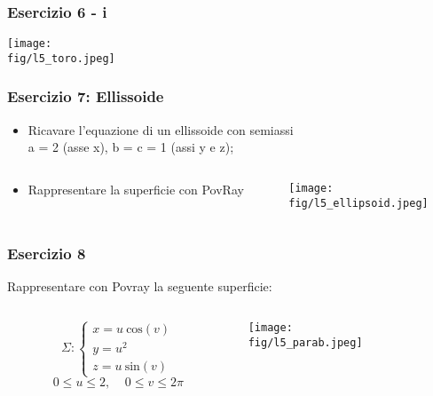 \documentclass{beamer}
\newcommand{\fig}{./figures} %
\newcommand{\msin}{\mbox{sin}} %
\newcommand{\mcos}{\mbox{cos}} %
\begin{document}
\begin{frame}
\frametitle{Esercizio 6 - i}
\texttt{[image: \\fig/l5\_toro.jpeg]}
\end{frame}

\begin{frame}
\frametitle{Esercizio 7: Ellissoide}
\begin{itemize}
\item Ricavare l'equazione di un ellissoide con semiassi \\
a = 2 (asse x), b = c = 1 (assi y e z);
\end{itemize}
\begin{columns}
\begin{column}{0.58\textwidth}
\begin{itemize}
\item Rappresentare la superficie con PovRay
\end{itemize}
\end{column}
\begin{column}{0.39\textwidth}
\texttt{[image: \\fig/l5\_ellipsoid.jpeg]}

\end{column}
\end{columns}
%
\end{frame}
\begin{frame}
\frametitle{Esercizio 8}
Rappresentare con Povray la seguente superficie:
\begin{columns}
\begin{column}{0.58\textwidth}
\begin{displaymath}
\Sigma:
\begin{cases}
x = u~\mcos(v)\\ 
y = u^2\\
z = u~\msin(v)
\end{cases}
\end{displaymath}
\begin{displaymath}
0\le u \le 2, \;\;\;\; 0\le v\le 2\pi
\end{displaymath}
\end{column}
\begin{column}{0.39\textwidth}
\texttt{[image: \\fig/l5\_parab.jpeg]}

\end{column}
\end{columns}
%
\end{frame}
\end{document}
